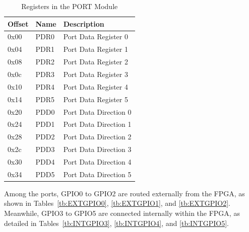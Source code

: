 \begin{table}[h!]
\centering
\begin{tabular}{|l|l|l|}
\hline
\textbf{Offset} & \textbf{Name} & \textbf{Description} \\ \hline
0x00            & PDR0          & Port Data Register 0 \\ \hline
0x04            & PDR1          & Port Data Register 1 \\ \hline
0x08            & PDR2          & Port Data Register 2 \\ \hline
0x0c            & PDR3          & Port Data Register 3 \\ \hline
0x10            & PDR4          & Port Data Register 4 \\ \hline
0x14            & PDR5          & Port Data Register 5 \\ \hline
0x20            & PDD0          & Port Data Direction 0 \\ \hline
0x24            & PDD1          & Port Data Direction 1 \\ \hline
0x28            & PDD2          & Port Data Direction 2 \\ \hline
0x2c            & PDD3          & Port Data Direction 3 \\ \hline
0x30            & PDD4          & Port Data Direction 4 \\ \hline
0x34            & PDD5          & Port Data Direction 5 \\ \hline
\end{tabular}
\caption{Registers in the PORT Module}
\label{tb:PORTREG}
\end{table}

Among the ports, GPIO0 to GPIO2 are routed externally from the FPGA, as shown in Tables~\ref{tb:EXTGPIO0}, \ref{tb:EXTGPIO1}, and \ref{tb:EXTGPIO2}. Meanwhile, GPIO3 to GPIO5 are connected internally within the FPGA, as detailed in Tables~\ref{tb:INTGPIO3}, \ref{tb:INTGPIO4}, and \ref{tb:INTGPIO5}.

